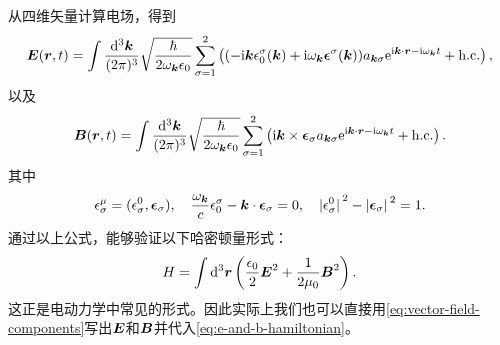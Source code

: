 从四维矢量计算电场，得到
\begin{equation}
    \vb*{E}(\vb*{r}, t) = \int \frac{\dd[3]{\vb*{k}}}{(2\pi)^3} \sqrt{\frac{\hbar}{2\omega_{\vb*{k}} \epsilon_0}} \sum_{\sigma=1}^2 \left( (- \mathrm{i} \vb*{k} \epsilon_0^\sigma(\vb*{k}) + \mathrm{i} \omega_{\vb*{k}} \vb*{\epsilon}^\sigma(\vb*{k})) a_{\vb*{k} \sigma} \mathrm{e}^{\mathrm{i} \vb*{k} \cdot \vb*{r} - \mathrm{i} \omega_{\vb*{k}} t} + \text{h.c.} \right),
\end{equation}
以及
\begin{equation}
    \vb*{B}(\vb*{r}, t) = \int \frac{\dd[3]{\vb*{k}}}{(2\pi)^3} \sqrt{\frac{\hbar}{2\omega_{\vb*{k}} \epsilon_0}} \sum_{\sigma=1}^2 \left( \mathrm{i} \vb*{k} \times \vb*{\epsilon}_\sigma a_{\vb*{k} \sigma} \mathrm{e}^{\mathrm{i} \vb*{k} \cdot \vb*{r} - \mathrm{i} \omega_{\vb*{k}} t } + \text{h.c.} \right).
\end{equation}
其中
\begin{equation}
    \epsilon^\mu_\sigma = (\epsilon_\sigma^0, \vb*{\epsilon}_\sigma), \quad \frac{\omega_{\vb*{k}}}{c} \epsilon_0^\sigma - \vb*{k} \cdot \vb*{\epsilon}_\sigma = 0, \quad \abs*{\epsilon_\sigma^0}^2 - \abs*{\vb*{\epsilon}_\sigma}^2 = 1.
\end{equation}
通过以上公式，能够验证以下哈密顿量形式：
\begin{equation}
    H = \int \dd[3]{\vb*{r}} \left( \frac{\epsilon_0}{2} \vb*{E}^2 + \frac{1}{2\mu_0} \vb*{B}^2 \right).
    \label{eq:e-and-b-hamiltonian}
\end{equation}
这正是电动力学中常见的形式。因此实际上我们也可以直接用\eqref{eq:vector-field-components}写出$\vb*{E}$和$\vb*{B}$并代入\eqref{eq:e-and-b-hamiltonian}。

